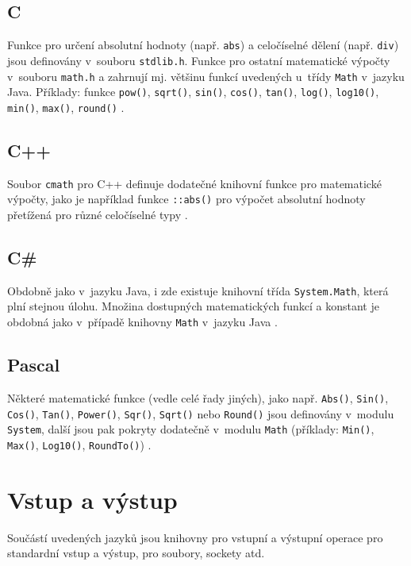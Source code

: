 \documentclass[onepage, a4paper, 12pt]{bakalarka}
\begin{document}
\subsection{C}
Funkce pro určení absolutní hodnoty (např. \texttt{abs}) a celočíselné dělení (např. \texttt{div}) jsou definovány v~souboru \texttt{stdlib.h}. Funkce pro ostatní matematické výpočty v~souboru \texttt{math.h} a zahrnují mj. většinu funkcí uvedených u~třídy \texttt{Math} v~jazyku Java. Příklady: funkce \texttt{pow()}, \texttt{sqrt()}, \texttt{sin()}, \texttt{cos()}, \texttt{tan()}, \texttt{log()}, \texttt{log10()}, \texttt{min()}, \texttt{max()}, \texttt{round()} \cite{cpp-guide-cstdlib, cpp-guide-cmath}.

\subsection{C++}
Soubor \texttt{cmath} pro C++ definuje dodatečné knihovní funkce pro matematické výpočty, jako je například funkce \texttt{::abs()} pro výpočet absolutní hodnoty přetížená pro různé celočíselné typy \cite{cpp-guide-cstdlib, cpp-guide-abs}.

\subsection{C\#}
Obdobně jako v~jazyku Java, i zde existuje knihovní třída \texttt{System.Math}, která plní stejnou úlohu. Množina dostupných matematických funkcí a konstant je obdobná jako v~případě knihovny \texttt{Math} v~jazyku Java \cite{cs-guide-math}.

\subsection{Pascal}
Některé matematické funkce (vedle celé řady jiných), jako např. \texttt{Abs()}, \texttt{Sin()}, \texttt{Cos()}, \texttt{Tan()}, \texttt{Power()}, \texttt{Sqr()}, \texttt{Sqrt()} nebo \texttt{Round()} jsou definovány v~modulu \texttt{System}, další jsou pak pokryty dodatečně v~modulu \texttt{Math} (příklady: \texttt{Min()}, \texttt{Max()}, \texttt{Log10()}, \texttt{RoundTo()}) \cite{pas-guide-system, pas-guide-math}.

\section{Vstup a výstup}
Součástí uvedených jazyků jsou knihovny pro vstupní a výstupní operace pro standardní vstup a výstup, pro soubory, sockety atd.
\end{document}
